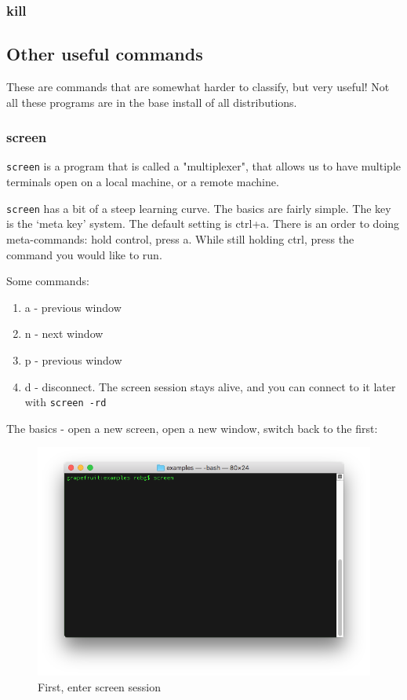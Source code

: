 \subsubsection{kill}

\subsection {Other useful commands}

These are commands that are somewhat harder to classify, but very useful! Not
all these programs are in the base install of all distributions.

\subsubsection {screen}

{\tt screen} is a program that is called a "multiplexer", that allows us to have multiple
terminals open on a local machine, or a remote machine. 

{\tt screen} has a bit of a steep learning curve. The basics are fairly simple. The
key is the `meta key' system. The default setting is ctrl+a. There is an order to doing
meta-commands: hold control, press a. While still holding ctrl, press the command
you would like to run.

Some commands:
\begin{enumerate}
	\item a - previous window
	\item n - next window
	\item p - previous window
	\item d - disconnect. The screen session stays alive, and you can connect to it later with {\tt screen -rd}
\end{enumerate}

The basics - open a new screen, open a new window, switch back to the first:

\begin{figure}
		\includegraphics[scale=0.6]{shell/screen1.png} 
		\caption{First, enter screen session}
		\label{screen1}
\end{figure}

